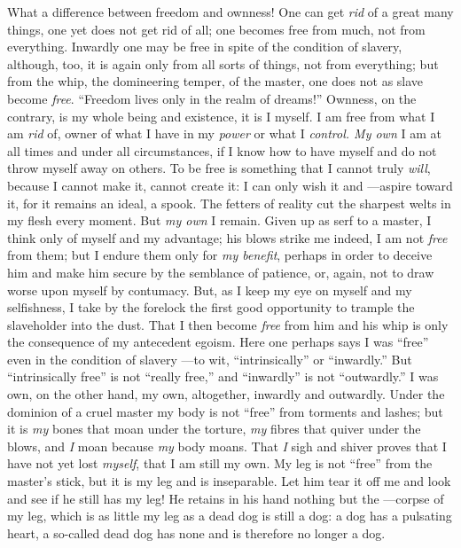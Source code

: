 What a difference between freedom and ownness! One can get \textit{rid} of a 
great many things, one yet does not get rid of all; one becomes free from 
much, not from everything. Inwardly one may be free in spite of the condition 
of slavery, although, too, it is again only from all sorts of things, not from 
everything; but from the whip, the domineering temper, of the master, one does 
not as slave become \textit{free}. ``Freedom lives only in the realm of 
dreams!'' Ownness, on the contrary, is my whole being and existence, it is I 
myself. I am free from what I am \textit{rid} of, owner of what I have in my 
\textit{power} or what I \textit{control. My own} I am at all times and under 
all circumstances, if I know how to have myself and do not throw myself away 
on others. To be free is something that I cannot truly \textit{will}, because 
I cannot make it, cannot create it: I can only wish it and ---aspire toward 
it, for it remains an ideal, a spook. The fetters of reality cut the sharpest 
welts in my flesh every moment. But \textit{my own} I remain. Given up as serf 
to a master, I think only of myself and my advantage; his blows strike me 
indeed, I am not \textit{free} from them; but I endure them only for 
\textit{my benefit}, perhaps in order to deceive him and make him secure by 
the semblance of patience, or, again, not to draw worse upon myself by 
contumacy. But, as I keep my eye on myself and my selfishness, I take by the 
forelock the first good opportunity to trample the slaveholder into the dust. 
That I then become \textit{free} from him and his whip is only the consequence 
of my antecedent egoism. Here one perhaps says I was ``free'' even in the 
condition of slavery ---to wit, ``intrinsically'' or ``inwardly.'' But 
``intrinsically free'' is not ``really free,'' and ``inwardly'' is not 
``outwardly.'' I was own, on the other hand, my own, altogether, inwardly 
and outwardly. Under the dominion of a cruel master my body is not ``free'' 
from torments and lashes; but it is \textit{my} bones that moan under the 
torture, \textit{my} fibres that quiver under the blows, and \textit{I} moan 
because \textit{my} body moans. That \textit{I} sigh and shiver proves that I 
have not yet lost \textit{myself}, that I am still my own. My leg is not 
``free'' from the master's stick, but it is my leg and is inseparable. Let 
him tear it off me and look and see if he still has my leg! He retains in his 
hand nothing but the ---corpse of my leg, which is as little my leg as a dead 
dog is still a dog: a dog has a pulsating heart, a so-called dead dog has none 
and is therefore no longer a dog.

